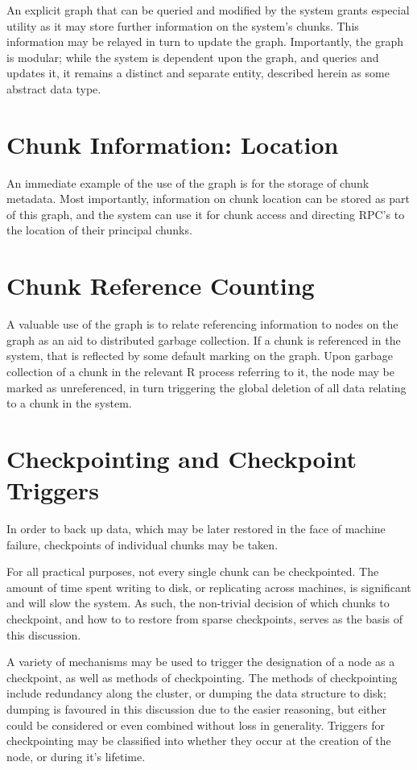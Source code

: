 \documentclass[10pt, a4paper]{article}
\begin{document}
An explicit graph that can be queried and modified by the system grants especial utility as it may store further information on the system's chunks.
This information may be relayed in turn to update the graph.
Importantly, the graph is modular; while the system is dependent upon the graph, and queries and updates it, it remains a distinct and separate entity, described herein as some abstract data type.

\section{Chunk Information: Location}

An immediate example of the use of the graph is for the storage of chunk metadata.
Most importantly, information on chunk location can be stored as part of this graph, and the system can use it for chunk access and directing RPC's to the location of their principal chunks.

\section{Chunk Reference Counting}

A valuable use of the graph is to relate referencing information to nodes on the graph as an aid to distributed garbage collection.
If a chunk is referenced in the system, that is reflected by some default marking on the graph.
Upon garbage collection of a chunk in the relevant R process referring to it, the node may be marked as unreferenced, in turn triggering the global deletion of all data relating to a chunk in the system.

\section{Checkpointing and Checkpoint Triggers}

In order to back up data, which may be later restored in the face of machine failure, checkpoints of individual chunks may be taken\cite{elnozahy2002recovery}.

For all practical purposes, not every single chunk can be checkpointed.
The amount of time spent writing to disk, or replicating across machines, is significant and will slow the system.
As such, the non-trivial decision of which chunks to checkpoint, and how to to restore from sparse checkpoints, serves as the basis of this discussion.

A variety of mechanisms may be used to trigger the designation of a node as a checkpoint, as well as methods of checkpointing.
The methods of checkpointing include redundancy along the cluster, or dumping the data structure to disk; dumping is favoured in this discussion due to the easier reasoning, but either could be considered or even combined without loss in generality\cite{walters2009replication}.
Triggers for checkpointing may be classified into whether they occur at the creation of the node, or during it's lifetime.
\end{document}
